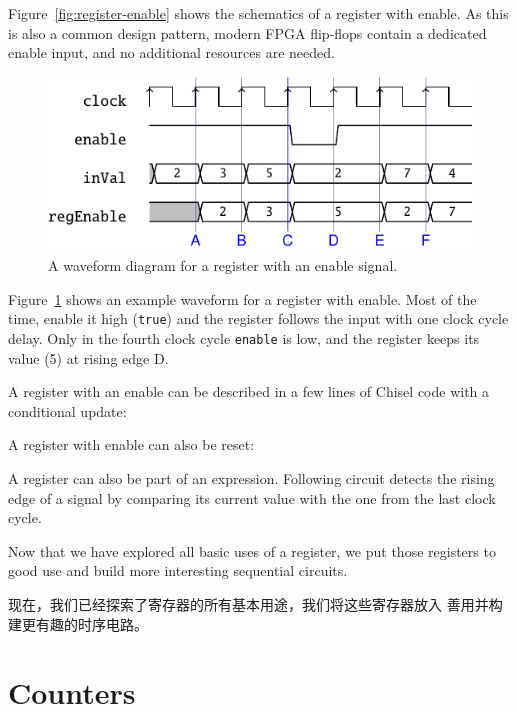 \documentclass[%
    10pt,
    headinclude, footexclude,
    openright, %
    notitlepage,
    cleardoubleempty,
    headsepline,
    pointlessnumbers,
    bibtotoc, idxtotoc,
    ]{scrbook}
\newcommand{\code}[1]{{\small{\texttt{#1}}}}
\begin{document}
Figure~\ref{fig:register-enable} shows the schematics of a register with enable.
As this is also a common design pattern, modern FPGA flip-flops contain a
dedicated enable input, and no additional resources are needed.

\begin{figure}
  \centering
  \includegraphics[scale=1]{figures/reg_en_wave}
  \caption{A waveform diagram for a register with an enable signal.}
  \label{fig:register-en-wave}
\end{figure}

Figure~\ref{fig:register-en-wave} shows an example waveform for a register
with enable. Most of the time, enable it high (\code{true}) and the register
follows the input with one clock cycle delay. Only in the fourth clock cycle
\code{enable} is low, and the register keeps its value (5) at rising edge D.

A register with an enable can be described in a few lines of Chisel code
with a conditional update:


\noindent A register with enable can also be reset:


A register can also be part of an expression. Following circuit detects the rising edge
of a signal by comparing its current value with the one from the last clock cycle.




Now that we have explored all basic uses of a register, we put those registers to
good use and build more interesting sequential circuits.


现在，我们已经探索了寄存器的所有基本用途，我们将这些寄存器放入
善用并构建更有趣的时序电路。

\section{Counters}
\label{sec:counter}
\end{document}
